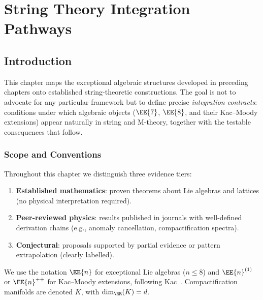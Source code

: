 
\chapter{String Theory Integration Pathways}
\label{ch:string_theory_integration}

\section{Introduction}

This chapter maps the exceptional algebraic structures developed in preceding chapters
onto established string-theoretic constructions.  The goal is not to advocate for any
particular framework but to define precise \emph{integration contracts}: conditions
under which algebraic objects ($\EE{7}$, $\EE{8}$, and their Kac--Moody extensions)
appear naturally in string and M-theory, together with the testable consequences that
follow.

\subsection{Scope and Conventions}

Throughout this chapter we distinguish three evidence tiers:
\begin{enumerate}
    \item \textbf{Established mathematics}: proven theorems about Lie algebras and
          lattices (no physical interpretation required).
    \item \textbf{Peer-reviewed physics}: results published in journals with
          well-defined derivation chains (e.g., anomaly cancellation, compactification
          spectra).
    \item \textbf{Conjectural}: proposals supported by partial evidence or pattern
          extrapolation (clearly labelled).
\end{enumerate}

We use the notation $\EE{n}$ for exceptional Lie algebras ($n \le 8$) and
$\EE{n}^{(1)}$ or $\EE{n}^{++}$ for Kac--Moody extensions, following
Kac~\cite{kac1990infinite}.  Compactification manifolds are denoted $K$, with
$\dim_\RR(K) = d$.

